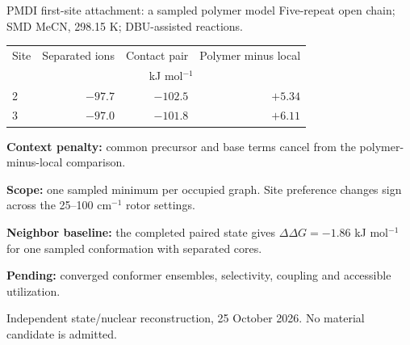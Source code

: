 \begin{frame}{PMDI first-site attachment: a sampled polymer model}
\small Five-repeat open chain; SMD MeCN, 298.15 K; DBU-assisted reactions.
\medskip\centering
\begin{tabular}{lrrr}\toprule
Site & Separated ions & Contact pair & Polymer minus local\\
 & \multicolumn{3}{c}{kJ mol$^{-1}$}\\\midrule
2 & $-97.7$ & $-102.5$ & $+5.34$\\
3 & $-97.0$ & $-101.8$ & $+6.11$\\
\bottomrule\end{tabular}
\par\medskip\raggedright
\textbf{Context penalty:} common precursor and base terms cancel from the polymer-minus-local comparison.
\par\medskip\textbf{Scope:} one sampled minimum per occupied graph. Site preference changes sign across the 25--100 cm$^{-1}$ rotor settings.
\par\medskip\textbf{Neighbor baseline:} the completed paired state gives $\Delta\Delta G=-1.86$ kJ mol$^{-1}$ for one sampled conformation with separated cores.
\par\smallskip\textbf{Pending:} converged conformer ensembles, selectivity, coupling and accessible utilization.
\par\smallskip\footnotesize Independent state/nuclear reconstruction, 25 October 2026. No material candidate is admitted.
\end{frame}
